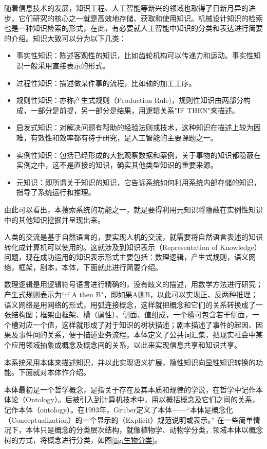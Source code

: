 \documentclass[12pt,a4paper]{article}
\begin{document}
	随着信息技术的发展，知识工程、人工智能等新兴的领域也取得了日新月异的进步，它们研究的核心之一就是高效地存储、获取和使用知识。机械设计知识的检索也是一种知识检索的形式，在此，有必要就人工智能中知识的分类和表达进行简要的介绍。知识大致可以分为以下几类：
	\begin{itemize}
		\item
	事实性知识：陈述客观性的知识，比如齿轮机构可以传递力和运动。事实性知识一般采用直接表示的形式。
		\item
	过程性知识：描述做某件事的流程，比如轴的加工工序。
		\item
	规则性知识：亦称产生式规则（Production Rule)，规则性知识由两部分构成，一部分是前提，另一部分是结果，用逻辑关系"IF THEN"来描述。
		\item
	启发式知识：对解决问题有帮助的经验法则或技术，这种知识在描述上较为困难，有效性和效率都有待于研究，是人工智能的主要课题之一。
		\item
	实例性知识：包括已经形成的大批观察数据和案例，关于事物的知识都隐蔽在实例之中，这不是直接的知识，确实其他类型知识的重要来源。
		\item
	元知识：即所谓关于知识的知识，它告诉系统如何利用系统内部存储的知识，指导了系统运行和推理。
	\end{itemize}
	
	由此可以看出，本搜索系统的功能之一，就是要得利用元知识将隐蔽在实例性知识中的其他知识挖掘并呈现出来。
	
	人类的交流是基于自然语言的，要实现人机的交流，就需要将自然语言表述的知识转化成计算机可以使用的。这就涉及到知识表示（Representation of Knowledge）问题，现在成功运用的知识表示形式主要包括：数理逻辑，产生式规则，语义网络，框架，剧本，本体，下面就此进行简要介绍。
	
	数理逻辑是用逻辑符号语言进行精确的，没有歧义的描述，用数学方法进行研究；产生式规则表示为“if A then B"，即如果A则B，以此可以实现正、反两种推理；语义网络是用网络的形式，用弧连接概念，这样就把概念和它们的关系转换成了一张结构图；框架由框架、槽（属性）、侧面、值组成，一个槽可包含若干侧面，一个槽对应一个值，这样就形成了对于知识的树状描述；剧本描述了事件的起因、因果及事件间的关系，便于描述业务流程。本体定义了公共词汇集，把现实社会中某个应用领域抽象成概念及概念间的关系，以此来实现信息共享和知识共享。 
	
	本系统采用本体来描述知识，并以此实现语义扩展，隐性知识向显性知识转换的功能。下面就对本体作介绍。
	
	本体最初是一个哲学概念，是指关于存在及其本质和规律的学说，在哲学中记作本体论（Ontology）。后被引入到计算机技术中，用以概括概念及它们之间的关系，记作本体（ontology）。在1993年，Gruber定义了本体——“本体是概念化（Conceptualization）的一个显示的（Explicit）规范说明或表示。”\cite{gruber1993} 在一些简单情况下，本体只是概念的分类层次结构，就像植物学、动物学分类，领域本体以概念树的方式，将概念进行分类，如图\ref{fig:生物分类}。
	
\end{document}
